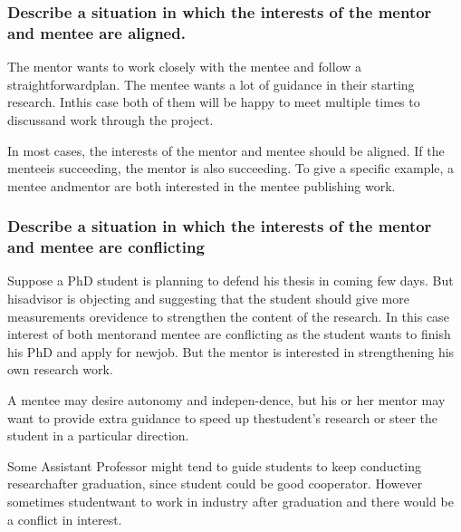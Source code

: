 \documentclass{beamer}
\begin{document}
\begin{frame} %
\frametitle{ Describe a situation in which the interests of the mentor and mentee are aligned.}

\medskip

The mentor wants to work closely with the mentee and follow a straightforwardplan.  The mentee wants a lot of guidance in their starting research.  Inthis case both of them will be happy to meet multiple times to discussand work through the project.


In most cases, the interests of the mentor and mentee should be aligned.  If the menteeis succeeding, the mentor is also succeeding.  To give a specific example, a mentee andmentor are both interested in the mentee publishing work.






\end{frame}

\begin{frame} %
\frametitle{   Describe a situation in which the interests of the mentor and mentee are conflicting}

Suppose a PhD student is planning to defend his thesis in coming few days.  But hisadvisor is objecting and suggesting that the student should give more measurements orevidence to strengthen the content of the research.  In this case interest of both mentorand mentee are conflicting as the student wants to finish his PhD and apply for newjob.  But the mentor is interested in strengthening his own research work.

A mentee may desire autonomy and indepen-dence,  but  his  or  her  mentor  may  want  to  provide  extra  guidance  to  speed  up  thestudent’s research or steer the student in a particular direction.

Some  Assistant  Professor  might  tend  to  guide  students  to  keep  conducting  researchafter graduation, since student could be good cooperator.  However sometimes studentwant to work in industry after graduation and there would be a conflict in interest.

\end{frame}
\end{document}
